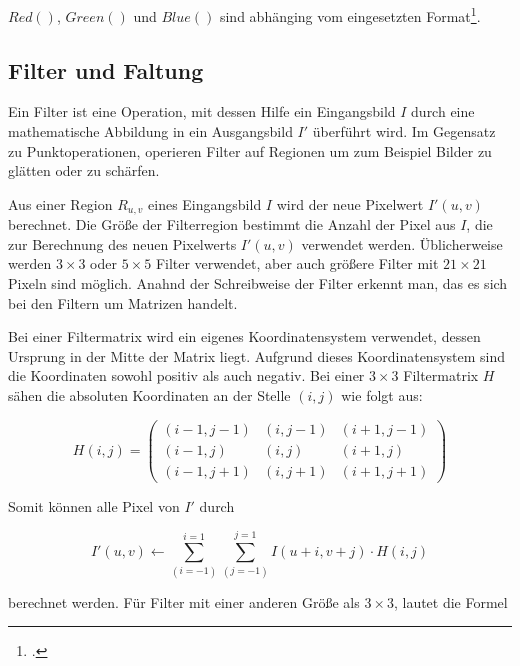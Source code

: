 $Red()$, $Green()$ und $Blue()$ sind abhänging vom eingesetzten Format\footcite[Vgl.][S.~236--237]{burger05}.

\subsection{Filter und Faltung} %
\label{sub:filter}
Ein Filter ist eine Operation, mit dessen Hilfe ein Eingangsbild $I$ durch eine mathematische Abbildung in ein
 Ausgangsbild $I'$ überführt wird. Im Gegensatz zu Punktoperationen, operieren Filter auf Regionen um zum Beispiel
 Bilder zu glätten oder zu schärfen.

Aus einer Region $R_{u,v}$ eines Eingangsbild $I$ wird der neue Pixelwert $I'(u,v)$ berechnet. Die Größe der
 Filterregion bestimmt die Anzahl der Pixel aus $I$, die zur Berechnung des neuen Pixelwerts $I'(u,v)$ verwendet
 werden. Üblicherweise werden $3 \times 3$ oder $5 \times 5$ Filter verwendet, aber auch größere Filter mit $21 \times
 21$ Pixeln sind möglich. Anahnd der Schreibweise der Filter erkennt man, das es sich bei den Filtern um Matrizen
 handelt.

Bei einer Filtermatrix wird ein eigenes Koordinatensystem verwendet, dessen Ursprung in der Mitte der Matrix liegt.
 Aufgrund dieses Koordinatensystem sind die Koordinaten sowohl positiv als auch negativ. Bei einer $3 \times 3$
 Filtermatrix $H$ sähen die absoluten Koordinaten an der Stelle $(i,j)$ wie folgt aus:

\begin{equation}
	H(i,j) =
	\begin{pmatrix}
		\left(i-1, j-1\right)&	\left(i, j-1\right)&	\left(i+1, j-1\right)\\
		\left(i-1, j\right)& 	\left(i, j\right)&		\left(i+1, j\right)\\
		\left(i-1, j+1\right)&	\left(i, j+1\right)&	\left(i+1, j+1\right)
	\end{pmatrix}
\end{equation}

Somit können alle Pixel von $I'$ durch

\begin{equation}
	I'\left(u,v\right) \gets
	\sum \limits_{\left(i = -1\right)}^{i = 1}
	\sum \limits_{\left(j = -1\right)}^{j = 1}
	I\left(u + i, v + j\right) \cdot H\left(i,j\right)
\end{equation}

berechnet werden. Für Filter mit einer anderen Größe als $3 \times 3$, lautet die Formel

